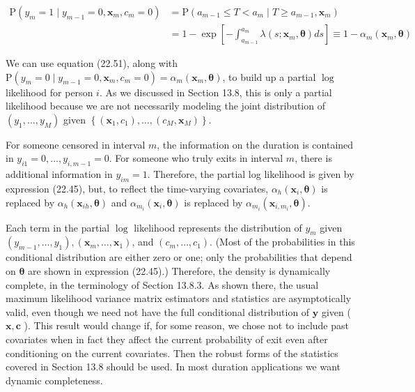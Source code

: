 \documentclass[10pt]{article}
\begin{document}
\begin{align*}
\mathrm{P}\left(y_{m}=1 \mid y_{m-1}=0, \mathbf{x}_{m}, c_{m}=0\right) & =\mathrm{P}\left(a_{m-1} \leq T<a_{m} \mid T \geq a_{m-1}, \mathbf{x}_{m}\right) \\
& =1-\exp \left[-\int_{a_{m-1}}^{a_{m}} \lambda\left(s ; \mathbf{x}_{m}, \boldsymbol{\theta}\right) d s\right] \equiv 1-\alpha_{m}\left(\mathbf{x}_{m}, \boldsymbol{\theta}\right) \tag{22.51}
\end{align*}


We can use equation (22.51), along with $\mathrm{P}\left(y_{m}=0 \mid y_{m-1}=0, \mathbf{x}_{m}, c_{m}=0\right)=\alpha_{m}\left(\mathbf{x}_{m}, \boldsymbol{\theta}\right)$, to build up a partial $\log$ likelihood for person $i$. As we discussed in Section 13.8, this is only a partial likelihood because we are not necessarily modeling the joint distribution of $\left(y_{1}, \ldots, y_{M}\right)$ given $\left\{\left(\mathbf{x}_{1}, c_{1}\right), \ldots,\left(c_{M}, \mathbf{x}_{M}\right)\right\}$.

For someone censored in interval $m$, the information on the duration is contained in $y_{i 1}=0, \ldots, y_{i, m-1}=0$. For someone who truly exits in interval $m$, there is additional information in $y_{i m}=1$. Therefore, the partial log likelihood is given by expression (22.45), but, to reflect the time-varying covariates, $\alpha_{h}\left(\mathbf{x}_{i}, \boldsymbol{\theta}\right)$ is replaced by $\alpha_{h}\left(\mathbf{x}_{i h}, \boldsymbol{\theta}\right)$ and $\alpha_{m_{i}}\left(\mathbf{x}_{i}, \boldsymbol{\theta}\right)$ is replaced by $\alpha_{m_{i}}\left(\mathbf{x}_{i, m_{i}}, \boldsymbol{\theta}\right)$.

Each term in the partial $\log$ likelihood represents the distribution of $y_{m}$ given $\left(y_{m-1}, \ldots, y_{1}\right),\left(\mathbf{x}_{m}, \ldots, \mathbf{x}_{1}\right)$, and $\left(c_{m}, \ldots, c_{1}\right)$. (Most of the probabilities in this conditional distribution are either zero or one; only the probabilities that depend on $\boldsymbol{\theta}$ are shown in expression (22.45).) Therefore, the density is dynamically complete, in the terminology of Section 13.8.3. As shown there, the usual maximum likelihood variance matrix estimators and statistics are asymptotically valid, even though we need not have the full conditional distribution of $\mathbf{y}$ given ( $\mathbf{x}, \mathbf{c}$ ). This result would change if, for some reason, we chose not to include past covariates when in fact they affect the current probability of exit even after conditioning on the current covariates. Then the robust forms of the statistics covered in Section 13.8 should be used. In most duration applications we want dynamic completeness.
\end{document}
